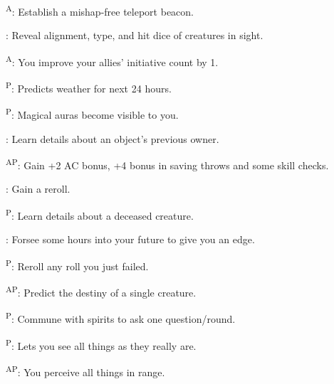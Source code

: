 \begin{enumerate*}
\item {}\textsuperscript{A}: Establish a mishap-free teleport beacon.

      : Reveal alignment, type, and hit dice of creatures in sight.

      \textsuperscript{A}: You improve your allies' initiative count by 1.

      \textsuperscript{P}: Predicts weather for next 24 hours.

\item {}\textsuperscript{P}: Magical auras become visible to you.

      : Learn details about an object's previous owner.

      \textsuperscript{AP}: Gain +2 AC bonus, +4 bonus in saving throws and some skill checks.

      : Gain a reroll. %

\item {}\textsuperscript{P}: Learn details about a deceased creature.

      : Forsee some hours into your future to give you an edge.

\item {}\textsuperscript{P}: Reroll any roll you just failed. %

      \textsuperscript{AP}: Predict the destiny of a single creature.

\item {}\textsuperscript{P}: Commune with spirits to ask one question/round.

      \textsuperscript{P}: Lets you see all things as they really are.

\item {}\textsuperscript{AP}: You perceive all things in range.
\end{enumerate*}



